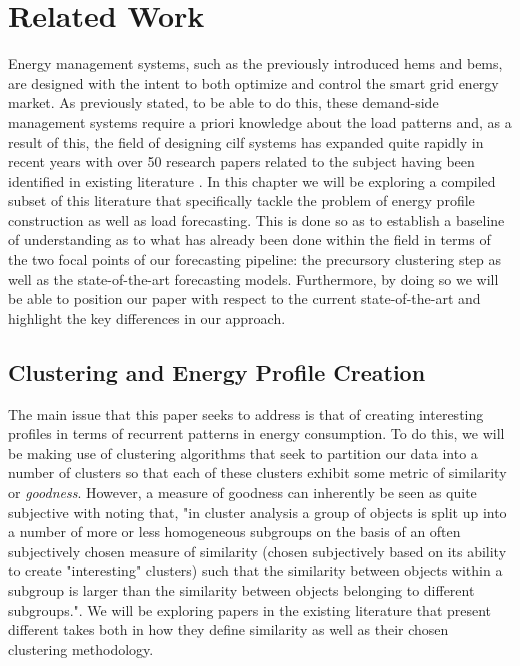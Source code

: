 \chapter{Related Work}
\label{ch:Related-Work}
Energy management systems, such as the previously introduced \gls{hems} and \gls{bems}, are designed with the intent to both optimize and control the smart grid energy market. As previously stated, to be able to do this, these demand-side management systems require a priori knowledge about the load patterns and, as a result of this, the field of designing \gls{cilf} systems has expanded quite rapidly in recent years with over 50 research papers related to the subject having been identified in existing literature \cite{Fallah}. In this chapter we will be exploring a compiled subset of this literature that specifically tackle the problem of energy profile construction as well as load forecasting. This is done so as to establish a baseline of understanding as to what has already been done within the field in terms of the two focal points of our forecasting pipeline: the precursory clustering step as well as the state-of-the-art forecasting models. Furthermore, by doing so we will be able to position our paper with respect to the current state-of-the-art and highlight the key differences in our approach.

\section{Clustering and Energy Profile Creation}
\label{sec:Related-Work:Clustering-and-Energy-Profile-Creation}
The main issue that this paper seeks to address is that of creating interesting profiles in terms of recurrent patterns in energy consumption. To do this, we will be making use of clustering algorithms that seek to partition our data into a number of clusters so that each of these clusters exhibit some metric of similarity or \textit{goodness}. However, a measure of goodness can inherently be seen as quite subjective with \citet{BackerJain} noting that, "in cluster analysis a group of objects is split up into a number of more or less homogeneous subgroups on the basis of an often subjectively chosen measure of similarity (\ie chosen subjectively based on its ability to create "interesting" clusters) such that the similarity between objects within a subgroup is larger than the similarity between objects belonging to different subgroups.". We will be exploring papers in the existing literature that present different takes both in how they define similarity as well as their chosen clustering methodology.

